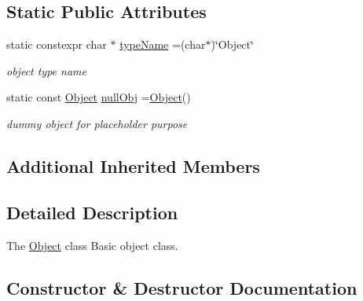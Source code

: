 \subsection*{Static Public Attributes}
\begin{DoxyCompactItemize}
\item 
\hypertarget{classObject_add9e5b23ab163db74d191ed7fe5b7f70}{}static constexpr char $\ast$ \hyperlink{classObject_add9e5b23ab163db74d191ed7fe5b7f70}{type\+Name} =(char$\ast$)\char`\"{}Object\char`\"{}\label{classObject_add9e5b23ab163db74d191ed7fe5b7f70}

\begin{DoxyCompactList}\small\item\em object type name \end{DoxyCompactList}\item 
\hypertarget{classObject_ad72b7e373242e30424c4affc2bf74497}{}static const \hyperlink{classObject}{Object} \hyperlink{classObject_ad72b7e373242e30424c4affc2bf74497}{null\+Obj} =\hyperlink{classObject}{Object}()\label{classObject_ad72b7e373242e30424c4affc2bf74497}

\begin{DoxyCompactList}\small\item\em dummy object for placeholder purpose \end{DoxyCompactList}\end{DoxyCompactItemize}
\subsection*{Additional Inherited Members}


\subsection{Detailed Description}
The \hyperlink{classObject}{Object} class Basic object class. 

\subsection{Constructor \& Destructor Documentation}
\hypertarget{classObject_af6520fb8cac84e70aec3ea95a88a31db}{}
